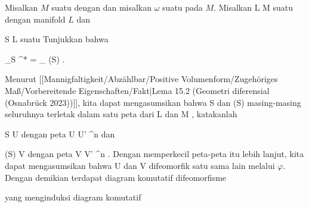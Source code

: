 {

Misalkan $M$ suatu
dengan
dan misalkan $\omega$ suatu
pada $M$. Misalkan
\maabbdisp {\varphi} { L } { M
} {}
suatu
dengan manifold $L$ dan

\mavergleichskette
{\vergleichskette
{ S
}
{ \subseteq }{ L
}
{  }{
}
{    }{
}
{   }{
}
}
{}{}{}
suatu
Tunjukkan bahwa

\mavergleichskettedisp
{\vergleichskette
{ \int_S \varphi^* \omega
}
{ =} { \int_{ \varphi(S)} \omega
}
{ } {
}
{ } {
}
{ } {
}
}
{}{}{.}

}
{

Menurut
[[Mannigfaltigkeit/Abzählbar/Positive Volumenform/Zugehöriges Maß/Vorbereitende Eigenschaften/Fakt|Lema 15.2 (Geometri diferensial (Osnabrück 2023))]],
kita dapat mengasumsikan bahwa
\mathkor {} {S} {dan} {\varphi(S)} {}
masing-masing seluruhnya terletak dalam satu peta dari
\mathkor {} {L} {dan} {M} {},
katakanlah

\mavergleichskette
{\vergleichskette
{ S
}
{ \subseteq }{ U
}
{  }{
}
{    }{
}
{   }{
}
}
{}{}{}
dengan peta
\maabbdisp {\alpha} { U } { U' \subseteq \R^n
} {}
dan

\mavergleichskette
{\vergleichskette
{ \varphi(S)
}
{ \subseteq }{ V
}
{  }{
}
{    }{
}
{   }{
}
}
{}{}{}
dengan peta
\maabbdisp {\beta} { V } { V' \subseteq \R^n
} {.}
Dengan memperkecil peta-peta itu lebih lanjut, kita dapat mengasumsikan bahwa
\mathkor {} {U} {dan} {V} {}
difeomorfik satu sama lain melalui $\varphi$. Dengan demikian terdapat diagram komutatif difeomorfisme

 {  }

yang menginduksi diagram komutatif

 {  }

}
